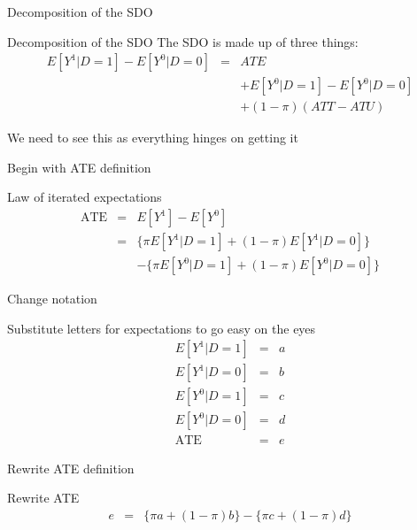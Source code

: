 \documentclass{beamer}
\begin{document}
\begin{frame}{Decomposition of the SDO}

  \begin{block}{Decomposition of the SDO}
    The SDO is made up of three things:
    \begin{eqnarray*}
      E[Y^1 | D=1] - E[Y^0 | D=0]&=& ATE\nonumber \\
      &&+ E[Y^0|D=1] - E[Y^0|D=0] \nonumber \\
      && + (1-\pi)(ATT - ATU)
    \end{eqnarray*}
  \end{block}

\bigskip

We need to see this as everything hinges on getting it
\end{frame}


\begin{frame}{Begin with ATE definition}

  \begin{block}{Law of iterated expectations}
    \begin{eqnarray*}
      \text{ATE}&=&E[Y^1]-E[Y^0]  \\
      &=& \{\pi E[Y^1 | D=1] + (1-\pi)E[Y^1 | D=0]\}  \\
      & & - \{\pi E[Y^0|D=1] + (1-\pi) E[Y^0 | D=0]\}
    \end{eqnarray*}
  \end{block}



\end{frame}

\begin{frame}{Change notation}



  \begin{block}{Substitute letters for expectations to go easy on the eyes}
    \begin{eqnarray*}
      E[Y^1|D=1] &=& a  \\
      E[Y^1|D=0] &=& b  \\
      E[Y^0|D=1] &=& c  \\
      E[Y^0|D=0] &=& d  \\
      \text{ATE} &=& e
    \end{eqnarray*}
  \end{block}


\end{frame}

\begin{frame}{Rewrite ATE definition}


  \begin{block}{Rewrite ATE}
    \begin{eqnarray*}
      e&=&\{\pi{a} + (1-\pi)b\} - \{\pi{c} + (1-\pi)d\}
    \end{eqnarray*}
  \end{block}

\end{frame}
\end{document}
